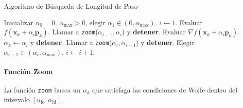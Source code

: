 \begin{algorithm}[H]
\caption{Algoritmo de Búsqueda de Longitud de Paso}
\label{alg:line_search}
\begin{algorithmic}[1]
\STATE Inicializar $\alpha_0 = 0$, $\alpha_{\text{max}} > 0$, elegir $\alpha_1 \in (0, \alpha_{\text{max}})$.
\STATE $i \gets 1$.
\REPEAT
    \STATE Evaluar $f(\mathbf{x}_k + \alpha_i \mathbf{p}_k)$.
        \STATE Llamar a \texttt{zoom}($\alpha_{i-1}, \alpha_i$) y \textbf{detener}.
    \ENDIF
    \STATE Evaluar $\nabla f(\mathbf{x}_k + \alpha_i \mathbf{p}_k)$.
        \STATE $\alpha_k \gets \alpha_i$ y \textbf{detener}.
    \ENDIF
        \STATE Llamar a \texttt{zoom}($\alpha_i, \alpha_{i-1}$) y \textbf{detener}.
    \ENDIF
    \STATE Elegir $\alpha_{i+1} \in (\alpha_i, \alpha_{\text{max}})$.
    \STATE $i \gets i + 1$.
\end{algorithmic}
\end{algorithm}

\paragraph{Función Zoom}

La función \texttt{zoom} busca un $\alpha_k$ que satisfaga las condiciones de Wolfe dentro del intervalo $[\alpha_{\text{lo}}, \alpha_{\text{hi}}]$.

